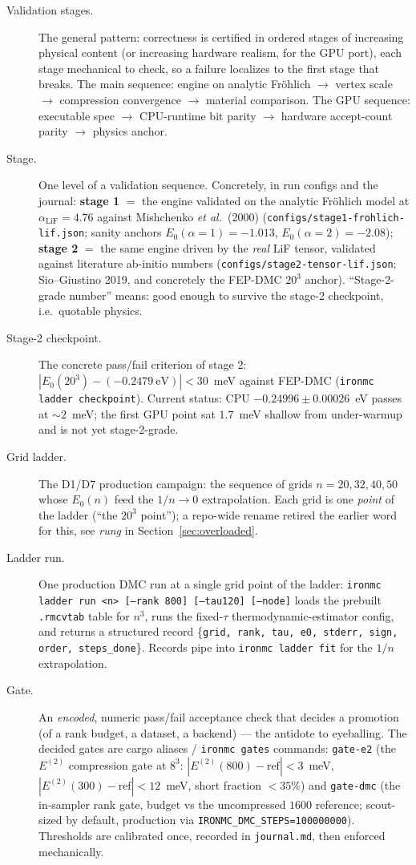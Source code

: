 \documentclass[11pt]{article}
\newcommand{\term}[1]{\item[#1.]}
\begin{document}
\begin{description}
\term{Validation stages} The general pattern: correctness is certified in ordered
  stages of increasing physical content (or increasing hardware realism, for the
  GPU port), each stage mechanical to check, so a failure localizes to the first
  stage that breaks. The main sequence: engine on analytic Fr\"ohlich $\to$ vertex
  scale $\to$ compression convergence $\to$ material comparison. The GPU sequence:
  executable spec $\to$ CPU-runtime bit parity $\to$ hardware accept-count parity
  $\to$ physics anchor.

\term{Stage} One level of a validation sequence. Concretely, in run configs and the
  journal:
  \textbf{stage 1} $=$ the engine validated on the analytic Fr\"ohlich model at
  $\alpha_{\mathrm{LiF}}=4.76$ against Mishchenko \emph{et al.}\ (2000)
  (\texttt{configs/stage1-frohlich-lif.json}; sanity anchors $E_{0}(\alpha{=}1)=-1.013$,
  $E_{0}(\alpha{=}2)=-2.08$);
  \textbf{stage 2} $=$ the same engine driven by the \emph{real} LiF tensor, validated
  against literature ab-initio numbers
  (\texttt{configs/stage2-tensor-lif.json}; Sio--Giustino 2019, and concretely the
  FEP-DMC $20^{3}$ anchor). ``Stage-2-grade number'' means: good enough to survive the
  stage-2 checkpoint, i.e.\ quotable physics.

\term{Stage-2 checkpoint} The concrete pass/fail criterion of stage 2:
  $|E_{0}(20^{3})-(-0.2479~\mathrm{eV})|<30$~meV against FEP-DMC
  (\texttt{ironmc ladder checkpoint}). Current status: CPU
  $-0.24996\pm0.00026$~eV passes at $\sim2$~meV; the first GPU point sat $1.7$~meV
  shallow from under-warmup and is not yet stage-2-grade.

\term{Grid ladder} The D1/D7 production campaign: the sequence of grids
  $n=20,32,40,50$ whose $E_{0}(n)$ feed the $1/n\to0$ extrapolation. Each grid is one
  \emph{point} of the ladder (``the $20^{3}$ point''); a repo-wide rename retired the
  earlier word for this, see \emph{rung} in Section~\ref{sec:overloaded}.

\term{Ladder run} One production DMC run at a single grid point of the ladder:
  \texttt{ironmc ladder run <n> [--rank 800] [--tau120] [--node]} loads the prebuilt
  \texttt{.rmcvtab} table for $n^{3}$, runs the fixed-$\tau$ thermodynamic-estimator
  config, and returns a structured record
  \{\texttt{grid, rank, tau, e0, stderr, sign, order, steps\_done}\}. Records pipe
  into \texttt{ironmc ladder fit} for the $1/n$ extrapolation.

\term{Gate} An \emph{encoded}, numeric pass/fail acceptance check that decides a
  promotion (of a rank budget, a dataset, a backend) --- the antidote to eyeballing.
  The decided gates are cargo aliases / \texttt{ironmc gates} commands:
  \texttt{gate-e2} (the $E^{(2)}$ compression gate at $8^{3}$:
  $|E^{(2)}(800)-\mathrm{ref}|<3$~meV, $|E^{(2)}(300)-\mathrm{ref}|<12$~meV, short
  fraction $<35\%$) and \texttt{gate-dmc} (the in-sampler rank gate, budget vs the
  uncompressed $1600$ reference; scout-sized by default, production via
  \texttt{IRONMC\_DMC\_STEPS=100000000}). Thresholds are calibrated once, recorded in
  \texttt{journal.md}, then enforced mechanically.


\end{description}
\end{document}

